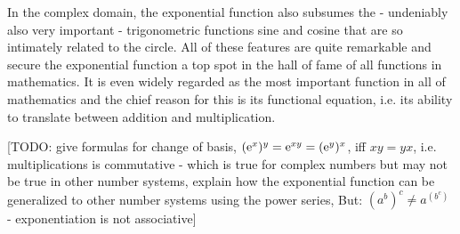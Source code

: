 \medskip
In the complex domain, the exponential function also subsumes the - undeniably also very important - trigonometric functions sine and cosine that are so intimately related to the circle. All of these features are quite remarkable and secure the exponential function a top spot in the hall of fame of all functions in mathematics. It is even widely regarded as the most important function in all of mathematics and the chief reason for this is its functional equation, i.e. its ability to translate between addition and multiplication.


[TODO: give formulas for change of basis, $(\operatorname{\mathrm{e}}^x)^y = \operatorname{\mathrm{e}}^{x y} = (\operatorname{\mathrm{e}}^y)^x$, iff $xy = yx$, i.e. multiplications is commutative - which is true for complex numbers but may not be true in other number systems, explain how the exponential function can be generalized to other number systems using the power series, But: $(a^b)^c \neq a^{(b^c)}$ - exponentiation is not associative]









